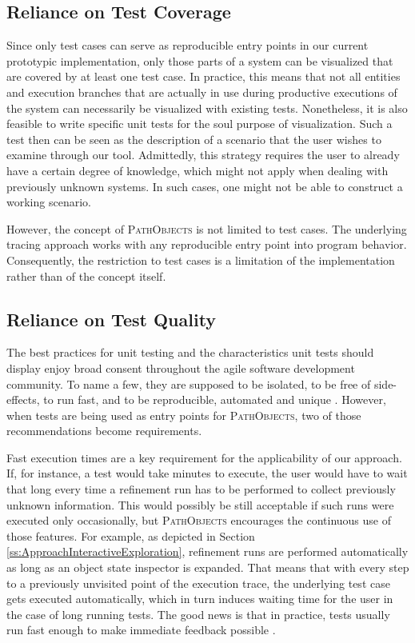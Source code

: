 \subsection{Reliance on Test Coverage}
\label{ss:DiscussionLimitationsCoverage}
Since only test cases can serve as reproducible entry points in our current prototypic implementation, only those parts of a system can be visualized that are covered by at least one test case.
In practice, this means that not all entities and execution branches that are actually in use during productive executions of the system can necessarily be visualized with existing tests.
Nonetheless, it is also feasible to write specific unit tests for the soul purpose of visualization.
Such a test then can be seen as the description of a scenario that the user wishes to examine through our tool.
Admittedly, this strategy requires the user to already have a certain degree of knowledge, which might not apply when dealing with previously unknown systems.
In such cases, one might not be able to construct a working scenario.

However, the concept of \textsc{PathObjects} is not limited to test cases.
The underlying tracing approach works with any reproducible entry point into program behavior.
Consequently, the restriction to test cases is a limitation of the implementation rather than of the concept itself.

\subsection{Reliance on Test Quality}
\label{ss:DiscussionLimitationsTestQuality}
The best practices for unit testing and the characteristics unit tests should display enjoy broad consent throughout the agile software development community.
To name a few, they are supposed to be isolated, to be free of side-effects, to run fast, and to be reproducible, automated and unique \cite{meszaros_xunit_2006, beck_test_2002}.
However, when tests are being used as entry points for \textsc{PathObjects}, two of those recommendations become requirements.

Fast execution times are a key requirement for the applicability of our approach.
If, for instance, a test would take minutes to execute, the user would have to wait that long every time a refinement run has to be performed to collect previously unknown information.
This would possibly be still acceptable if such runs were executed only occasionally, but \textsc{PathObjects} encourages the continuous use of those features.
For example, as depicted in Section \ref{ss:ApproachInteractiveExploration}, refinement runs are performed automatically as long as an object state inspector is expanded.
That means that with every step to a previously unvisited point of the execution trace, the underlying test case gets executed automatically, which in turn induces waiting time for the user in the case of long running tests. The good news is that in practice, tests usually run fast enough to make immediate feedback possible \cite{perscheid_immediacy_2010}.

